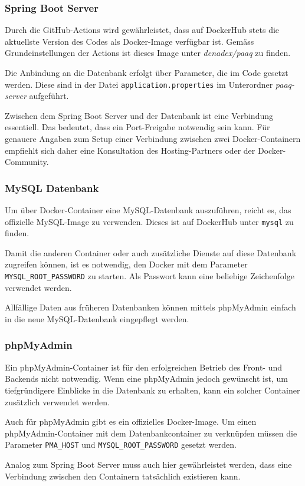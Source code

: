 \documentclass[../main.tex]{subfiles}
\begin{document}
	\subsubsection{Spring Boot Server}
	\par Durch die GitHub-Actions wird gewährleistet, dass auf DockerHub stets die aktuellste Version des Codes als Docker-Image verfügbar ist. Gemäss Grundeinstellungen der Actions ist dieses Image unter \textit{denadex/paaq} zu finden. 
	\par Die Anbindung an die Datenbank erfolgt über Parameter, die im Code gesetzt werden. Diese sind in der Datei \texttt{application.properties} im Unterordner \textit{paaq-server} aufgeführt.
	\par Zwischen dem Spring Boot Server und der Datenbank ist eine Verbindung essentiell. Das bedeutet, dass ein Port-Freigabe notwendig sein kann. Für genauere Angaben zum Setup einer Verbindung zwischen zwei Docker-Containern empfiehlt sich daher eine Konsultation des Hosting-Partners oder der Docker-Community.
	
	\subsubsection{MySQL Datenbank}
	\par Um über Docker-Container eine MySQL-Datenbank auszuführen, reicht es, das offizielle MySQL-Image zu verwenden. Dieses ist auf DockerHub unter \texttt{mysql} zu finden.
	\par Damit die anderen Container oder auch zusätzliche Dienste auf diese Datenbank zugreifen können, ist es notwendig, den Docker mit dem Parameter \texttt{MYSQL\_ROOT\_PASSWORD} zu starten. Als Passwort kann eine beliebige Zeichenfolge verwendet werden.
	\par Allfällige Daten aus früheren Datenbanken können mittels phpMyAdmin einfach in die neue MySQL-Datenbank eingepflegt werden.
	
	\subsubsection{phpMyAdmin}
	\par Ein phpMyAdmin-Container ist für den erfolgreichen Betrieb des Front- und Backends nicht notwendig. Wenn eine phpMyAdmin jedoch gewünscht ist, um tiefgründigere Einblicke in die Datenbank zu erhalten, kann ein solcher Container zusätzlich verwendet werden.
	\par Auch für phpMyAdmin gibt es ein offizielles Docker-Image. Um einen phpMyAdmin-Container mit dem Datenbankcontainer zu verknüpfen müssen die Parameter \texttt{PMA\_HOST} und \texttt{MYSQL\_ROOT\_PASSWORD} gesetzt werden.
	\par Analog zum Spring Boot Server muss auch hier gewährleistet werden, dass eine Verbindung zwischen den Containern tatsächlich existieren kann.
	
\end{document}
